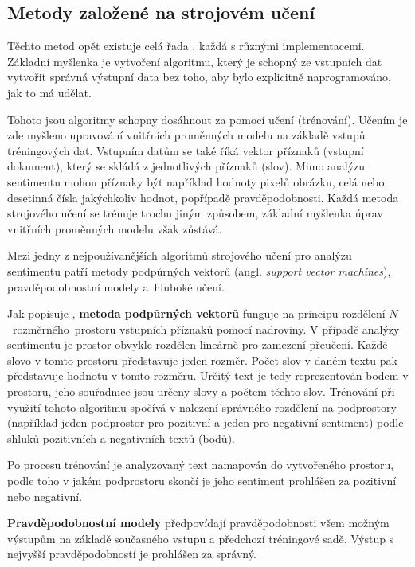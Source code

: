 \subsection{Metody založené na strojovém učení}
\label{machinelearning}
Těchto metod opět existuje celá řada \cite{approaches} \cite{MEDHAT20141093}, každá s různými implementacemi. 
Základní myšlenka je vytvoření algoritmu, který je schopný ze vstupních dat vytvořit správná výstupní data bez toho, aby bylo explicitně naprogramováno, jak to má udělat. 

Tohoto jsou algoritmy schopny dosáhnout za pomocí učení (trénování). Učením je zde myšleno upravování vnitřních proměnných modelu na základě vstupů tréningových dat. Vstupním datům se také říká vektor příznaků (vstupní dokument), který se skládá z jednotlivých příznaků (slov). Mimo analýzu sentimentu mohou příznaky být například hodnoty pixelů obrázku, celá nebo desetinná čísla jakýchkoliv hodnot, popřípadě pravděpodobnosti. Každá metoda strojového učení se trénuje trochu jiným způsobem, základní myšlenka úprav vnitřních proměnných modelu však zůstává.

Mezi jedny z nejpoužívanějších algoritmů strojového učení pro analýzu sentimentu patří metody podpůrných vektorů (angl. \emph{support vector machines}), pravděpodobnostní modely a~hluboké učení.

Jak popisuje \cite{svm}, \textbf{metoda podpůrných vektorů} funguje na principu rozdělení $N$~rozměrného~prostoru vstupních příznaků pomocí nadroviny. V případě analýzy sentimentu je prostor obvykle rozdělen lineárně pro zamezení přeučení. Každé slovo v tomto prostoru představuje jeden rozměr. Počet slov v daném textu pak představuje hodnotu v tomto rozměru. Určitý text je tedy reprezentován bodem v prostoru, jeho souřadnice jsou určeny slovy a počtem těchto slov.
Trénování při využití tohoto algoritmu spočívá v nalezení správného rozdělení na podprostory (například jeden podprostor pro pozitivní a jeden pro negativní sentiment) podle shluků pozitivních a negativních textů (bodů). 

Po procesu trénování je analyzovaný text namapován do vytvořeného prostoru, podle toho v jakém podprostoru skončí je jeho sentiment prohlášen za pozitivní nebo negativní. 


\textbf{Pravděpodobnostní modely} \cite{prob1} \cite{prob2} předpovídají pravděpodobnosti všem možným výstupům na základě současného vstupu a předchozí tréningové sadě. Výstup s nejvyšší pravděpodobností je prohlášen za správný.

